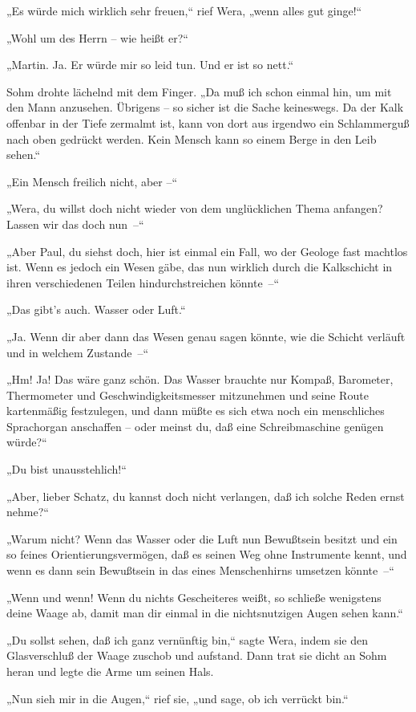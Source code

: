 „Es würde mich wirklich sehr freuen,“ rief Wera, „wenn alles gut
ginge!“

„Wohl um des Herrn – wie heißt er?“

„Martin. Ja. Er würde mir so leid tun. Und er ist so nett.“

Sohm drohte lächelnd mit dem Finger. „Da muß ich schon einmal hin,
um mit den Mann anzusehen. Übrigens – so sicher ist die Sache
keineswegs. Da der Kalk offenbar in der Tiefe zermalmt ist, kann
von dort aus irgendwo ein Schlammerguß nach oben gedrückt werden.
Kein Mensch kann so einem Berge in den Leib sehen.“

„Ein Mensch freilich nicht, aber –“

„Wera, du willst doch nicht wieder von dem unglücklichen Thema
anfangen? Lassen wir das doch nun~–“

„Aber Paul, du siehst doch, hier ist einmal ein Fall, wo der
Geologe fast machtlos ist. Wenn es jedoch ein Wesen gäbe, das nun
wirklich durch die Kalkschicht in ihren verschiedenen Teilen
hindurchstreichen könnte~–“

„Das gibt's auch. Wasser oder Luft.“

„Ja. Wenn dir aber dann das Wesen genau sagen könnte, wie die
Schicht verläuft und in welchem Zustande~–“

„Hm! Ja! Das wäre ganz schön. Das Wasser brauchte nur Kompaß,
Barometer, Thermometer und Geschwindigkeitsmesser mitzunehmen und
seine Route kartenmäßig festzulegen, und dann müßte es sich etwa
noch ein menschliches Sprachorgan anschaffen – oder meinst du, daß
eine Schreibmaschine genügen würde?“

„Du bist unausstehlich!“

„Aber, lieber Schatz, du kannst doch nicht verlangen, daß ich
solche Reden ernst nehme?“

„Warum nicht? Wenn das Wasser oder die Luft nun Bewußtsein besitzt
und ein so feines Orientierungsvermögen, daß es seinen Weg ohne
Instrumente kennt, und wenn es dann sein Bewußtsein in das eines
Menschenhirns umsetzen könnte~–“

„Wenn und wenn! Wenn du nichts Gescheiteres weißt, so schließe
wenigstens deine Waage ab, damit man dir einmal in die
nichtsnutzigen Augen sehen kann.“

„Du sollst sehen, daß ich ganz vernünftig bin,“ sagte Wera, indem
sie den Glasverschluß der Waage zuschob und aufstand. Dann trat sie
dicht an Sohm heran und legte die Arme um seinen Hals.

„Nun sieh mir in die Augen,“ rief sie, „und sage, ob ich verrückt
bin.“

